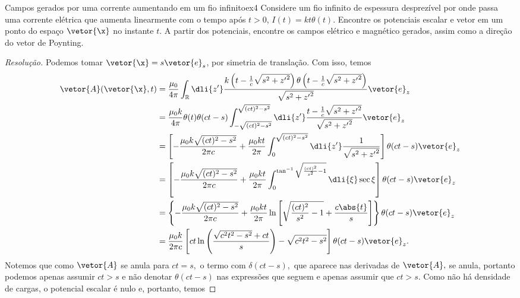 \begin{exercício}{Campos gerados por uma corrente aumentando em um fio infinito}{ex4}
   Considere um fio infinito de espessura desprezível por onde passa uma corrente elétrica que aumenta linearmente com o tempo após \(t > 0\), \(I(t) = kt\theta(t)\). Encontre os potenciais escalar e vetor em um ponto do espaço \(\vetor{\x}\) no instante \(t\). A partir dos potenciais, encontre os campos elétrico e magnético gerados, assim como a direção do vetor de Poynting.
\end{exercício}
\begin{proof}[Resolução]
   Podemos tomar \(\vetor{\x} = s \vetor{e}_s\), por simetria de translação. Com isso, temos
   \begin{align*}
      \vetor{A}(\vetor{\x}, t) &= \frac{\mu_0}{4\pi} \int_{\mathbb{R}} \dli{z'} \frac{k \left(t - \frac1c\sqrt{s^2 + {z'}^2}\right) \theta\left(t - \frac1c\sqrt{s^2 + {z'}^2}\right)}{\sqrt{s^2 + {z'}^2}}\vetor{e}_z\\
                               &= \frac{\mu_0 k}{4\pi} \theta(t) \theta(ct - s)\int_{-\sqrt{(ct)^2 - s^2}}^{\sqrt{(ct)^2 - s^2}} \dli{z'} \frac{t - \frac1c \sqrt{s^2 + {z'}^2}}{\sqrt{s^2 + {z'}^2}}\vetor{e}_z\\
                               &= \left[-\frac{\mu_0 k\sqrt{(ct)^2 - s^2}}{2\pi c} + \frac{\mu_0 kt}{2\pi} \int_{0}^{\sqrt{(ct)^2 - s^2}} \dli{z'} \frac{1}{\sqrt{s^2 + {z'}^2}}\right]\theta(ct - s)\vetor{e}_z\\
                               &= \left[-\frac{\mu_0 k\sqrt{(ct)^2 - s^2}}{2\pi c}+ \frac{\mu_0 kt}{2\pi} \int_{0}^{\tan^{-1}\sqrt{\frac{(ct)^2}{s^2} - 1}} \dli{\xi} \sec\xi\right]\theta(ct - s)\vetor{e}_z\\
                               &= \left\{-\frac{\mu_0 k\sqrt{(ct)^2 - s^2}}{2\pi c}+ \frac{\mu_0 kt}{2\pi} \ln\left[\sqrt{\frac{(ct)^2}{s^2} - 1} + \frac{c\abs{t}}{s}\right]\right\} \theta(ct - s)\vetor{e}_z\\
                               &= \frac{\mu_0 k}{2\pi c} \left[ct \ln\left(\frac{\sqrt{c^2 t^2 - s^2} + c t}{s}\right) - \sqrt{c^2 t^2 - s^2}\right]\theta(ct - s)\vetor{e}_z.
   \end{align*}
   Notemos que como \(\vetor{A}\) se anula para \(ct = s,\) o termo com \(\delta(ct - s),\) que aparece nas derivadas de \(\vetor{A},\) se anula, portanto podemos apenas assumir \(ct > s\) e não denotar \(\theta(ct - s)\) nas expressões que seguem e apenas assumir que \(ct > s\). Como não há densidade de cargas, o potencial escalar é nulo e, portanto, temos

\end{proof}

